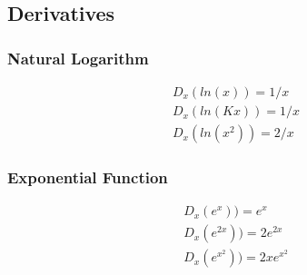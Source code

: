 \documentclass{article}
\begin{document}
\subsection{Derivatives}
\subsubsection{Natural Logarithm}
\begin{align*}
D_x(ln(x)) = 1/x\\
D_x(ln(Kx)) = 1/x\\
D_x(ln(x^2)) = 2/x
\end{align*}

\subsubsection{Exponential Function}
\begin{align*}
D_x(e^x)) = e^x\\
D_x(e^{2x})) = 2e^{2x}\\
D_x(e^{x^2})) = 2xe^{x^2}
\end{align*}
\end{document}
